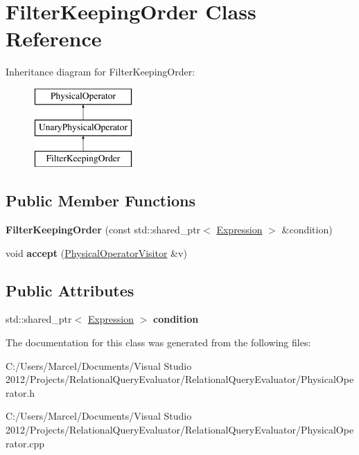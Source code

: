 \hypertarget{class_filter_keeping_order}{\section{Filter\+Keeping\+Order Class Reference}
\label{class_filter_keeping_order}
}
Inheritance diagram for Filter\+Keeping\+Order\+:\begin{figure}[H]
\begin{center}
\leavevmode
\includegraphics[height=3.000000cm]{class_filter_keeping_order}
\end{center}
\end{figure}
\subsection*{Public Member Functions}
\begin{DoxyCompactItemize}
\item 
\hypertarget{class_filter_keeping_order_abc6e727ea1b121b18bfd537a5c736676}{{\bfseries Filter\+Keeping\+Order} (const std\+::shared\+\_\+ptr$<$ \hyperlink{class_expression}{Expression} $>$ \&condition)}\label{class_filter_keeping_order_abc6e727ea1b121b18bfd537a5c736676}

\item 
\hypertarget{class_filter_keeping_order_a3d970e81588d96ac0d6538c17a22144c}{void {\bfseries accept} (\hyperlink{class_physical_operator_visitor}{Physical\+Operator\+Visitor} \&v)}\label{class_filter_keeping_order_a3d970e81588d96ac0d6538c17a22144c}

\end{DoxyCompactItemize}
\subsection*{Public Attributes}
\begin{DoxyCompactItemize}
\item 
\hypertarget{class_filter_keeping_order_a9958c9755be1bcd46a9fa67116d07e67}{std\+::shared\+\_\+ptr$<$ \hyperlink{class_expression}{Expression} $>$ {\bfseries condition}}\label{class_filter_keeping_order_a9958c9755be1bcd46a9fa67116d07e67}

\end{DoxyCompactItemize}


The documentation for this class was generated from the following files\+:\begin{DoxyCompactItemize}
\item 
C\+:/\+Users/\+Marcel/\+Documents/\+Visual Studio 2012/\+Projects/\+Relational\+Query\+Evaluator/\+Relational\+Query\+Evaluator/Physical\+Operator.\+h\item 
C\+:/\+Users/\+Marcel/\+Documents/\+Visual Studio 2012/\+Projects/\+Relational\+Query\+Evaluator/\+Relational\+Query\+Evaluator/Physical\+Operator.\+cpp\end{DoxyCompactItemize}
